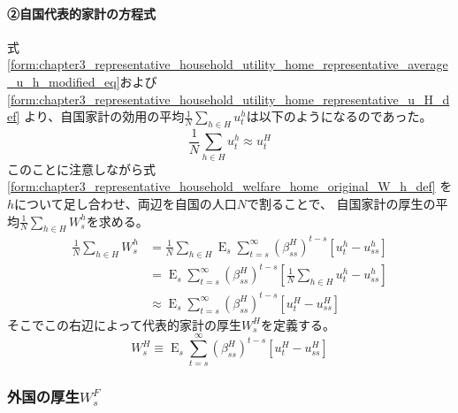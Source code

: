 \paragraph{②自国代表的家計の方程式}
\label{sec:chapter3_representative_household_welfare_home_representative}
式
\eqref{form:chapter3_representative_household_utility_home_representative_average_u_h_modified_eq}および
\eqref{form:chapter3_representative_household_utility_home_representative_u_H_def}
より、自国家計の効用の平均\(\frac{1}{N}\sum_{h\in H}u_t^h\)は以下のようになるのであった。
\begin{equation}
\label{form:chapter3_representative_household_welfare_home_representative_u_H_eq}
    \frac{1}{N}\sum_{h\in H}u_t^h\approx u_t^H
\end{equation}
このことに注意しながら式
\eqref{form:chapter3_representative_household_welfare_home_original_W_h_def}
を\(h\)について足し合わせ、両辺を自国の人口\(N\)で割ることで、
自国家計の厚生の平均\(\frac{1}{N}\sum_{h\in H}W_s^h\)を求める。
\begin{equation}
\label{form:chapter3_representative_household_welfare_home_representative_average_W_h_eq}
\begin{aligned}
    \frac{1}{N}\sum_{h\in H}W_s^h
    &=\frac{1}{N}\sum_{h\in H}\operatorname{E}_s\sum_{t=s}^{\infty}(\beta_{ss}^H)^{t-s}\left[u_t^h-u_{ss}^h\right] \\
    &=\operatorname{E}_s\sum_{t=s}^{\infty}(\beta_{ss}^H)^{t-s}\left[\frac{1}{N}\sum_{h\in H}u_t^h-u_{ss}^h\right] \\
    &\approx\operatorname{E}_s\sum_{t=s}^{\infty}(\beta_{ss}^H)^{t-s}\left[u_t^H-u_{ss}^H\right]
\end{aligned}
\end{equation}
そこでこの右辺によって代表的家計の厚生\(W_s^H\)を定義する。
\begin{equation}
\label{form:chapter3_representative_household_welfare_home_representative_W_H_def}
    W_s^H\equiv\operatorname{E}_s\sum_{t=s}^{\infty}(\beta_{ss}^H)^{t-s}\left[u_t^H-u_{ss}^H\right]
\end{equation}

\subsubsection{外国の厚生\(W_s^F\)}
\label{sec:chapter3_representative_household_welfare_foreign}

